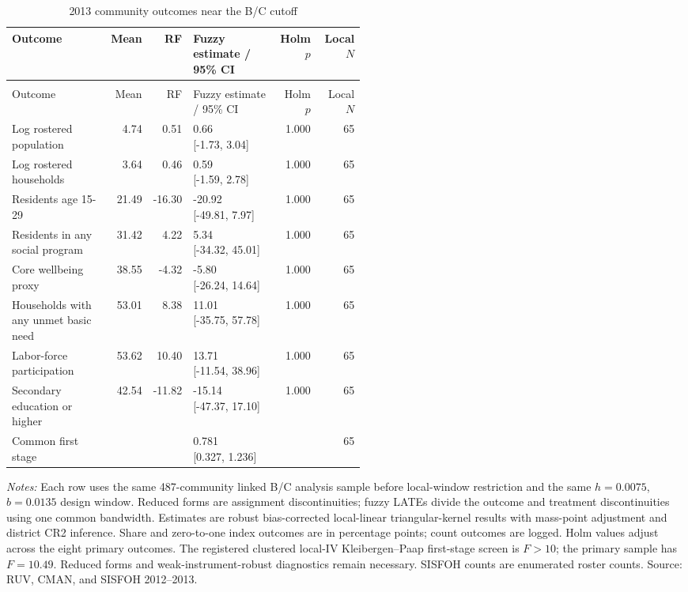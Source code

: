 \begingroup\fontsize{9.25}{11.4}\selectfont
\setlength{\tabcolsep}{3pt}\renewcommand{\arraystretch}{1.18}
\begin{longtable}{@{}>{\raggedright\arraybackslash}p{0.28\linewidth}rrp{0.24\linewidth}rr@{}}
\caption{2013 community outcomes near the B/C cutoff}\label{tab:pub_M03} \\
\toprule Outcome & Mean & RF & Fuzzy estimate / 95\% CI & Holm \(p\) & Local \(N\) \\ \midrule\endfirsthead
\multicolumn{6}{c}{\tablename\ \thetable{} -- continued} \\
\toprule Outcome & Mean & RF & Fuzzy estimate / 95\% CI & Holm \(p\) & Local \(N\) \\ \midrule\endhead
Log rostered population & 4.74 & 0.51 & \shortstack[r]{0.66 \\{} [-1.73, 3.04]} & 1.000 & 65 \\
Log rostered households & 3.64 & 0.46 & \shortstack[r]{0.59 \\{} [-1.59, 2.78]} & 1.000 & 65 \\
Residents age 15-29 & 21.49 & -16.30 & \shortstack[r]{-20.92 \\{} [-49.81, 7.97]} & 1.000 & 65 \\
Residents in any social program & 31.42 & 4.22 & \shortstack[r]{5.34 \\{} [-34.32, 45.01]} & 1.000 & 65 \\
Core wellbeing proxy & 38.55 & -4.32 & \shortstack[r]{-5.80 \\{} [-26.24, 14.64]} & 1.000 & 65 \\
Households with any unmet basic need & 53.01 & 8.38 & \shortstack[r]{11.01 \\{} [-35.75, 57.78]} & 1.000 & 65 \\
Labor-force participation & 53.62 & 10.40 & \shortstack[r]{13.71 \\{} [-11.54, 38.96]} & 1.000 & 65 \\
Secondary education or higher & 42.54 & -11.82 & \shortstack[r]{-15.14 \\{} [-47.37, 17.10]} & 1.000 & 65 \\
Common first stage &  &  & \shortstack[r]{0.781 \\{} [0.327, 1.236]} &  & 65 \\
\bottomrule\end{longtable}
\parbox{0.97\linewidth}{\footnotesize \textit{Notes:} Each row uses the same 487-community linked B/C analysis sample before local-window restriction and the same \(h=0.0075\), \(b=0.0135\) design window. Reduced forms are assignment discontinuities; fuzzy LATEs divide the outcome and treatment discontinuities using one common bandwidth. Estimates are robust bias-corrected local-linear triangular-kernel results with mass-point adjustment and district CR2 inference. Share and zero-to-one index outcomes are in percentage points; count outcomes are logged. Holm values adjust across the eight primary outcomes. The registered clustered local-IV Kleibergen--Paap first-stage screen is \(F>10\); the primary sample has \(F=10.49\). Reduced forms and weak-instrument-robust diagnostics remain necessary. SISFOH counts are enumerated roster counts. Source: RUV, CMAN, and SISFOH 2012--2013.}
